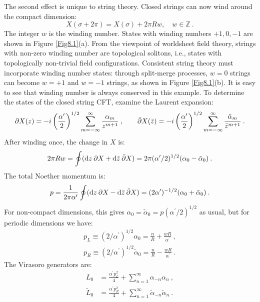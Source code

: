 The second effect is unique to string theory. Closed strings can now wind around the compact dimension:
\begin{equation}
	X(\sigma+2 \pi)=X(\sigma)+2 \pi R w, \quad w \in \mathds{Z} \:. \label{8.2.3}
\end{equation}
The integer $w$ is the winding number.
States with winding numbers $+1, 0, -1$ are shown in Figure \ref{Fig8.1}(a).
From the viewpoint of worldsheet field theory, strings with non-zero winding number are topological solitons, i.e., states with topologically non-trivial field configurations. Consistent string theory must incorporate winding number states: through split-merge processes, 
$w=0$ strings can become $w=+1$ and $w=-1$ strings, as shown in Figure \ref{Fig8.1}(b). It is easy to see that winding number is always conserved in this example.
To determine the states of the closed string CFT, examine the Laurent expansion:
\begin{equation}
	\partial X(z)=-i\left(\frac{\alpha^{\prime}}{2}\right)^{1 / 2} \sum_{m=-\infty}^{\infty} \frac{\alpha_{m}}{z^{m+1}}\:, \qquad 
	\bar{\partial} X(\bar{z})=-i\left(\frac{\alpha^{\prime}}{2}\right)^{1 / 2} \sum_{m=-\infty}^{\infty} \frac{\tilde{\alpha}_{m}}{\bar{z}^{m+1}} \:. \label{8.2.4}
\end{equation}
After winding once, the change in $X$ is:
\begin{equation}
	2 \pi R w=\oint(\mathrm{d} z\: \partial X + \mathrm{d} \bar{z}\: \bar{\partial} X)= 2 \pi(\alpha^{\prime}/2)^{1/2}(\alpha_{0}-\tilde{\alpha}_{0}) \:. \label{8.2.5}
\end{equation}
The total Noether momentum is:
\begin{equation}
	p=\frac{1}{2 \pi \alpha^{\prime}} \oint(\mathrm{d} z\: \partial X- \mathrm{d} \bar{z}\: \bar{\partial} X)
	=(2 \alpha^{\prime})^{-1 / 2}(\alpha_{0}+\tilde{\alpha}_{0}) \:. \label{8.2.6}
\end{equation}
For non-compact dimensions, this gives $\alpha_{0}=\tilde{\alpha}_{0}=p(\alpha^{\prime} / 2)^{1 / 2}$ as usual, but for periodic dimensions we have:
\begin{subequations} \label{8.2.7}
	\begin{align}
		p_{L} \equiv\left(2 / \alpha^{\prime}\right)^{1 / 2} \alpha_{0}=\frac{n}{R}+\frac{w R}{\alpha^{\prime}} \:, \label{8.2.7a} \\
		p_{R} \equiv\left(2 / \alpha^{\prime}\right)^{1 / 2} \tilde{\alpha}_{0}=\frac{n}{R}-\frac{w R}{\alpha^{\prime}} \:. \label{8.2.7b}
	\end{align}		
\end{subequations}
The Virasoro generators are:
\begin{subequations} \label{8.2.8}
	\begin{align}
		L_{0}&=\frac{\alpha^{\prime} p_{L}^{2}}{4}+\sum_{n=1}^{\infty} \alpha_{-n} \alpha_{n} \:, \label{8.2.8a} \\
		\tilde{L}_{0}&=\frac{\alpha^{\prime} p_{R}^{2}}{4}+\sum_{n=1}^{\infty} \tilde{\alpha}_{-n} \tilde{\alpha}_{n} \:. \label{8.2.8b}
	\end{align}		 				
\end{subequations}

